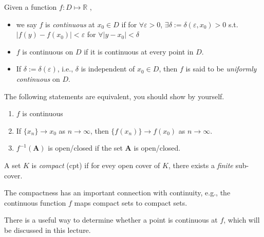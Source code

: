 \begin{definition}[Continuous]
Given a function $f:D\mapsto\mathbb{R}$
, 
\begin{itemize}
\item
we say $f$ is \emph{continuous} at $x_0\in D$ if for $\forall\varepsilon>0$, $\exists \delta:=\delta(\varepsilon,x_0) >0$ s.t. $|f(y) - f(x_0)|<\varepsilon$ for $\forall |y-x_0|<\delta$
\item
$f$ is continuous on $D$ if it is continuous at every point in $D$.
\item
If $\delta:=\delta(\varepsilon)$, i.e., $\delta$
 is independent of $x_0\in D$, then $f$ is said to be \emph{uniformly continuous} on $D$.
\end{itemize}
\end{definition}
\begin{remark}
The following statements are equivalent, you should show by yourself.
\begin{enumerate}
\item
$f$ is continuous
\item
If $\{x_n\}\to x_0$ as $n\to\infty$, then $\{f(x_n)\}\to f(x_0)$ as $n\to\infty$.
\item
$f^{-1}(\bm A)$ is open/closed if the set $\bm A$ is open/closed.
\end{enumerate}
\end{remark}

\begin{definition}[Compact]
A set $K$ is \emph{compact} (cpt) if for evey open cover of $K$, there exists a \emph{finite} sub-cover.
\end{definition}
\begin{remark}
The compactness has an important connection with continuity, e.g., the continuous function $f$ maps compact sets to compact sets.
\end{remark}
There is a useful way to determine whether a point is continuous at $f$, which will be discussed in this lecture.
